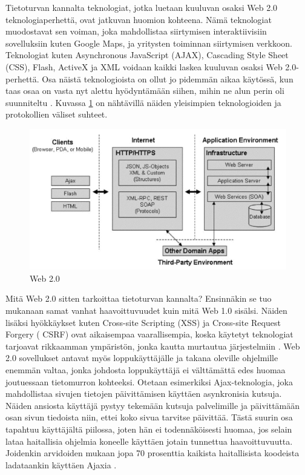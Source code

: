 Tietoturvan kannalta teknologiat, jotka luetaan kuuluvan osaksi Web 2.0
teknologiaperhettä, ovat jatkuvan huomion kohteena. Nämä teknologiat
muodostavat sen voiman, joka mahdollistaa siirtymisen interaktiivisiin
sovelluksiin kuten Google Maps, ja yritysten toiminnan siirtymisen verkkoon.
Teknologiat kuten Asynchronous JavaScript (AJAX), Cascading Style Sheet (CSS),
Flash, ActiveX ja XML voidaan kaikki laskea kuuluvan osaksi Web 2.0-perhettä.
Osa näistä teknologioista on ollut jo pidemmän aikaa käytössä, kun taas osaa on
vasta nyt alettu hyödyntämään siihen, mihin ne alun perin oli suunniteltu \cite{WEB2}.
Kuvassa \ref{web} on nähtävillä näiden yleisimpien teknologioiden ja protokollien
väliset suhteet.

\begin{figure}[htp]
\centering
\includegraphics[width=12cm]{pics/web.pdf}
\caption{Web 2.0}
\label{web}
\end{figure}

Mitä Web 2.0 sitten tarkoittaa tietoturvan kannalta? Ensinnäkin se tuo mukanaan
samat vanhat haavoittuvuudet kuin mitä Web 1.0 sisälsi. Näiden lisäksi
hyökkäykset kuten Cross-site Scripting (XSS) ja Cross-site Request Forgery (
CSRF) ovat aikaisempaa vaarallisempia, koska käytetyt teknologiat tarjoavat
rikkaamman ympäristön, jonka kautta murtautua järjestelmiin \cite{WEB2}. Web 2.0
sovellukset antavat myös loppukäyttäjälle ja takana oleville ohjelmille enemmän
valtaa, jonka johdosta loppukäyttäjä ei välttämättä edes huomaa joutuessaan
tietomurron kohteeksi. Otetaan esimerkiksi Ajax-teknologia, joka mahdollistaa
sivujen tietojen päivittämisen käyttäen asynkronisia kutsuja. Näiden ansiosta
käyttäjä pystyy tekemään kutsuja palvelimille ja päivittämään osan sivun
tiedoista niin, ettei koko sivua tarvitse päivittää. Tästä suurin osa tapahtuu
käyttäjältä piilossa, joten hän ei todennäköisesti huomaa, jos selain lataa
haitallisia ohjelmia koneelle käyttäen jotain tunnettua haavoittuvuutta. Joidenkin
arvidoiden mukaan jopa 70 prosenttia kaikista haitallisista koodeista ladataankin käyttäen
Ajaxia \cite{WEB2c}.

